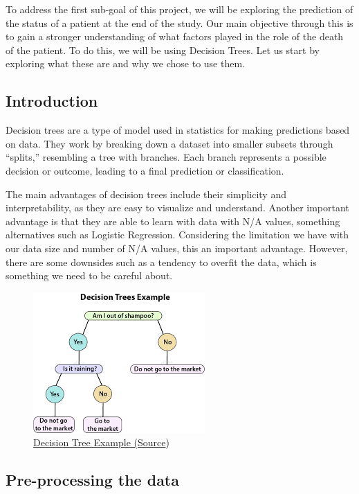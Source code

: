 \documentclass[
]{article}
\begin{document}
To address the first sub-goal of this project, we will be exploring the
prediction of the status of a patient at the end of the study. Our main
objective through this is to gain a stronger understanding of what
factors played in the role of the death of the patient. To do this, we
will be using Decision Trees. Let us start by exploring what these are
and why we chose to use them.

\hypertarget{introduction}{%
\subsection{Introduction}\label{introduction}}

Decision trees are a type of model used in statistics for making
predictions based on data. They work by breaking down a dataset into
smaller subsets through ``splits,'' resembling a tree with branches.
Each branch represents a possible decision or outcome, leading to a
final prediction or classification.

The main advantages of decision trees include their simplicity and
interpretability, as they are easy to visualize and understand. Another
important advantage is that they are able to learn with data with N/A
values, something alternatives such as Logistic Regression. Considering
the limitation we have with our data size and number of N/A values, this
an important advantage. However, there are some downsides such as a
tendency to overfit the data, which is something we need to be careful
about.

\begin{figure}
\centering
\includegraphics{DecTreeEg.png}
\caption{\ul{Decision Tree Example
(}\href{https://data-flair.training/blogs/r-decision-trees/}{Source})}
\end{figure}

\hypertarget{pre-processing-the-data}{%
\subsection{Pre-processing the data}\label{pre-processing-the-data}}
\end{document}
